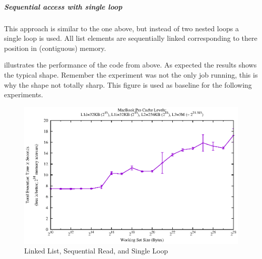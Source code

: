 \hypertarget{sequential-access-with-single-loop}{\subparagraph{Sequential
access with single loop}\label{sequential-access-with-single-loop}}

This approach is similar to the one above, but instead of two nested
loops a single loop is used. All list elements are sequentially linked
corresponding to there position in (contiguous) memory.

\begin{Shaded}
\begin{Highlighting}[]
  
   \NormalTok{l * cur = &list[}\NormalTok{];}
   
  \NormalTok{(} 
  \NormalTok{\{}
    \NormalTok{(}\NormalTok{)cur->pad[}\NormalTok{];}
  \NormalTok{\}}
   
\NormalTok{\}}
\end{Highlighting}
\end{Shaded}

 illustrates the performance of the code from above. As
expected the results shows the typical shape. Remember the experiment
was not the only job running, this is why the shape not totally sharp.
This figure is used as baseline for the following experiments.

\begin{figure}[htbp]
\centering
\includegraphics{appendix/plots-cache-measurements/plot-linked-list}
\caption{Linked List, Sequential Read, and Single Loop}
\label{app:ll-seqread-sl}
\end{figure}

